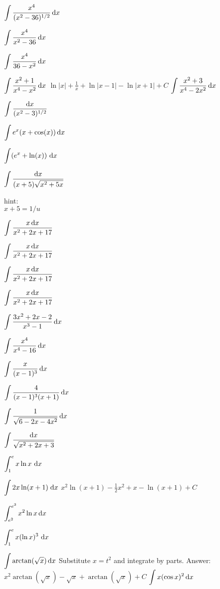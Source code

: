 \begin{multicols}{2}
\problem \(\displaystyle \int \frac{x^4}{(x^2 -36)^{1/2}}\, \mathrm{d} x  \) %

\problem \(\displaystyle \int \frac{x^4}{x^2-36} \, \mathrm{d} x\) %

\problem \(\displaystyle \int \frac{x^4}{36-x^2} \, \mathrm{d} x \) %


\problem \(\displaystyle \int \frac{x^2 + 1}{x^4 - x^2}\, \mathrm{d} x \) %
\answer %
$\ln|x|+\frac1x+\ln|x-1|-\ln|x+1|+C$
\endanswer
\problem \(\displaystyle \int \frac{x^2 + 3}{x^4 -2 x^2} \, \mathrm{d} x\) %

\problem \(\displaystyle \int \frac{\mathrm{d} x}{(x^2-3)^{1/2}} \) %

\problem \(\displaystyle \int e^x(x + \cos(x))\,\mathrm{d} x \) %

\problem \(\displaystyle \int (e^x + \ln(x)) \ \mathrm{d} x \) %

\problem \(\displaystyle \int \frac{\mathrm{d} x}{(x+5)\sqrt{x^2 + 5x}}\) %
\hfill\parbox{8em}{\raggedleft%
hint:\\$x+5 = 1/u$}

\problem \(\displaystyle \int\frac{x\,\mathrm{d} x}{x^2+2x+17}\) %

\problem \(\displaystyle \int\frac{x\,\mathrm{d} x}{x^2+2x+17}\) %

\problem \(\displaystyle \int\frac{x\,\mathrm{d} x}{x^2+2x+17}\) %

\problem \(\displaystyle \int\frac{x\,\mathrm{d} x}{x^2+2x+17}\) %

\problem \(\displaystyle \int \frac{3x^2 + 2x -2}{x^3 - 1} \, \mathrm{d} x \) %

\problem \(\displaystyle \int \frac{x^4}{x^4 - 16} \, \mathrm{d} x\) %

\problem \(\displaystyle \int \frac{x}{(x - 1)^3} \, \mathrm{d} x \) %

\problem \(\displaystyle \int \frac{4}{(x - 1)^3 (x+1)} \, \mathrm{d} x\) %

\problem \(\displaystyle \int \frac{1}{\sqrt{6 -2x -4x^2}} \, \mathrm{d} x \) %

\problem \(\displaystyle \int \frac{\mathrm{d} x}{\sqrt{x^2 + 2x +3}}\) %

\problem \(\displaystyle \int_1^{e} x \ln x\ \mathrm{d} x \) %

\problem \(\displaystyle \int 2x\ln(x+1)\;\mathrm{d} x\) %
\answer %
$x^2\ln(x+1) - \frac{1}{2}x^2 + x - \ln(x+1) + C$
\endanswer

\problem \(\displaystyle \int_{e^2}^{e^3} x^2 \ln x\, \mathrm{d} x\) %

\problem \(\displaystyle \int_1^{e} x (\ln x)^3\ \mathrm{d} x \) %

\problem \(\displaystyle \int \arctan(\sqrt x ) \, \mathrm{d} x\) %
\answer  Substitute $x=t^2$ and integrate by parts. Answer: %
$x^2\arctan(\sqrt{x})-\sqrt{x}+\arctan(\sqrt{x})+C$
\endanswer
\problem \(\displaystyle \int x(\cos x)^2\,\mathrm{d} x\) %


\end{multicols}
